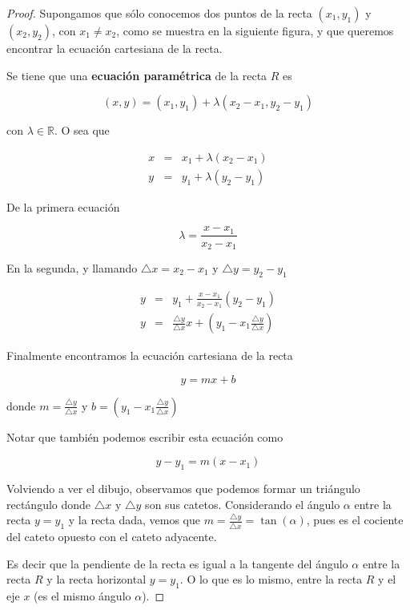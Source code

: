 \begin{proof}
Supongamos que sólo conocemos dos puntos de la recta $(x_1, y_1)$ y $(x_2, y_2)$, con $x_1 \neq x_2$, como se muestra en la siguiente figura, y que queremos encontrar la ecuación cartesiana de la recta.

Se tiene que una \textbf{ecuación paramétrica} de la recta $R$ es

$$(x,y) = (x_1, y_1) + \lambda(x_2 - x_1, y_2 - y_1)$$

con $\lambda \in \mathbb{R}$.  O sea que

\begin{eqnarray*}
x &=& x_1 + \lambda (x_2 - x_1) \\
y &=& y_1 + \lambda (y_2 - y_1) 
\end{eqnarray*}

De la primera ecuación

$$ \lambda = \frac{x - x_1}{x_2 - x_1}$$

En la segunda, y llamando $\triangle x = x_2 - x_1$ y $\triangle y = y_2 - y_1$

\begin{eqnarray*}
y &=& y_1 + \frac{x - x_1}{x_2 - x_1} (y_2 - y_1) \\
y &=& \frac{\triangle y}{\triangle x} x + \left( y_1 - x_1 \frac{\triangle y}{\triangle x} \right)
\end{eqnarray*}

Finalmente encontramos la ecuación cartesiana de la recta

$$ y = mx + b $$

donde $m = \frac{\triangle y}{\triangle x}$ y $ b = \left( y_1 - x_1 \frac{\triangle y}{\triangle x} \right) $

Notar que también podemos escribir esta ecuación como

$$ y - y_1 = m (x - x_1) $$

Volviendo a ver el dibujo, observamos que podemos formar un triángulo rectángulo donde $\triangle x$ y $\triangle y$ son sus catetos.  Considerando el ángulo $\alpha$ entre la recta $y = y_1$ y la recta dada, vemos que $m = \frac{\triangle y}{ \triangle x} = \tan(\alpha)$, pues es el cociente del cateto opuesto con el cateto adyacente.

Es decir que la pendiente de la recta es igual a la tangente del ángulo $\alpha$ entre la recta $R$ y la recta horizontal $y = y_1$.  O lo que es lo mismo, entre la recta $R$ y el eje $x$ (es el mismo ángulo $\alpha$).

\end{proof}


